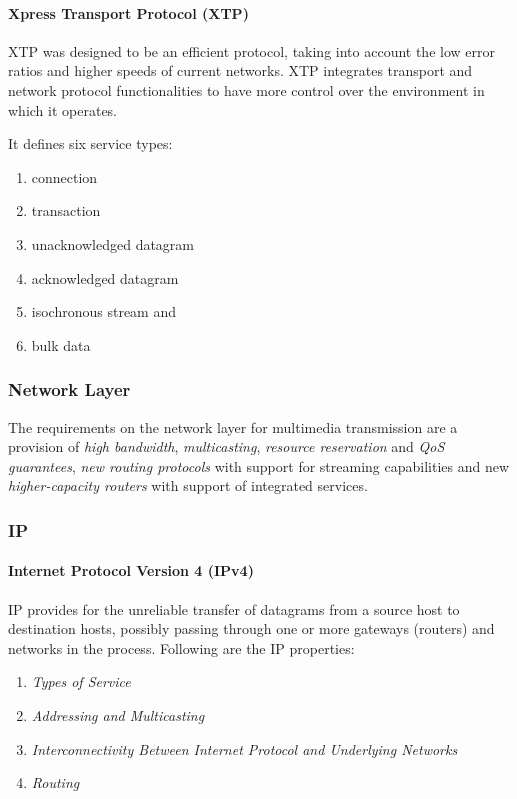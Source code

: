 \paragraph{Xpress Transport Protocol (XTP)}
XTP was designed to be an efficient protocol, taking into account the low error ratios and higher speeds of current networks. XTP integrates transport and network protocol functionalities to have more control over the environment in which it operates.

It defines six service types: 
\begin{multicols}{2}
	\begin{enumerate}
		\item connection
		\item transaction
		\item unacknowledged datagram
		\item acknowledged datagram
		\item isochronous stream and
		\item bulk data
	\end{enumerate}
\end{multicols}



\subsubsection{Network Layer}
The requirements on the network layer for multimedia transmission are a provision of \textit{high bandwidth}, \textit{multicasting}, \textit{resource reservation} and \textit{QoS guarantees}, \textit{new routing protocols} with support for streaming capabilities and new \textit{higher-capacity routers} with support of integrated services.	

\subsubsection*{IP}

\paragraph[IPv4]{Internet Protocol Version 4 (IPv4)}
IP provides for the unreliable transfer of datagrams from a source host to destination hosts, possibly passing through one or more gateways (routers) and networks in the process. Following are the IP properties:
\begin{enumerate}
	\item \textit{Types of Service}
	\item \textit{Addressing and Multicasting}
	\item \textit{Interconnectivity Between Internet Protocol and Underlying Networks}
	\item \textit{Routing}
\end{enumerate}

